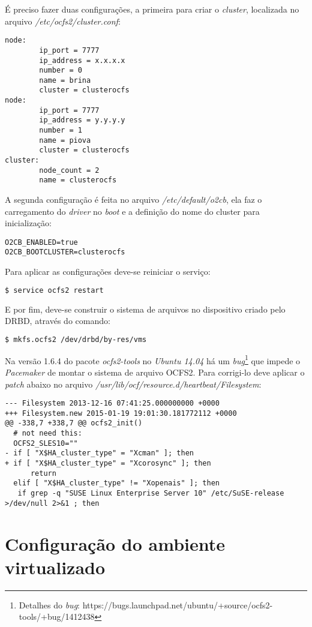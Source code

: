 É preciso fazer duas configurações, a primeira para criar o \textit{cluster}, localizada no arquivo \textit{/etc/ocfs2/cluster.conf}:
\begin{lstlisting}
node:
        ip_port = 7777
        ip_address = x.x.x.x
        number = 0
        name = brina
        cluster = clusterocfs
node:
        ip_port = 7777
        ip_address = y.y.y.y
        number = 1
        name = piova
        cluster = clusterocfs
cluster:
        node_count = 2
        name = clusterocfs
\end{lstlisting}

A segunda configuração é feita no arquivo \textit{/etc/default/o2cb}, ela faz o carregamento do \textit{driver} no \textit{boot} e a definição 
do nome do cluster para inicialização:
\begin{lstlisting}
O2CB_ENABLED=true
O2CB_BOOTCLUSTER=clusterocfs
\end{lstlisting}

Para aplicar as configurações deve-se reiniciar o serviço:
\begin{lstlisting}[language=bash]
 $ service ocfs2 restart
\end{lstlisting}

E por fim, deve-se construir o sistema de arquivos no dispositivo criado pelo \ac{DRBD}, através do comando:
\begin{lstlisting}[language=bash]
 $ mkfs.ocfs2 /dev/drbd/by-res/vms
\end{lstlisting}

Na versão 1.6.4 do pacote \textit{ocfs2-tools} no \textit{Ubuntu 14.04} há um \textit{bug}\footnote{Detalhes do \textit{bug}: 
https://bugs.launchpad.net/ubuntu/+source/ocfs2-tools/+bug/1412438} que impede o \textit{Pacemaker} de montar o sistema de arquivo \ac{OCFS2}. 
Para corrigi-lo deve aplicar o \textit{patch} abaixo no arquivo \textit{/usr/lib/ocf/resource.d/heartbeat/Filesystem}:
\begin{lstlisting}
--- Filesystem 2013-12-16 07:41:25.000000000 +0000
+++ Filesystem.new 2015-01-19 19:01:30.181772112 +0000
@@ -338,7 +338,7 @@ ocfs2_init()
  # not need this:
  OCFS2_SLES10=""
- if [ "X$HA_cluster_type" = "Xcman" ]; then
+ if [ "X$HA_cluster_type" = "Xcorosync" ]; then
      return
  elif [ "X$HA_cluster_type" != "Xopenais" ]; then
   if grep -q "SUSE Linux Enterprise Server 10" /etc/SuSE-release >/dev/null 2>&1 ; then
\end{lstlisting}

\section{Configuração do ambiente virtualizado}
\label{ap:confvirt}

